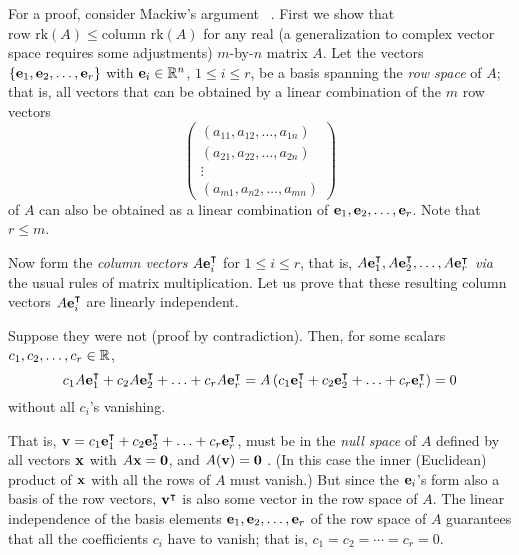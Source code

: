 {\color{OliveGreen}
\bproof

For a proof, consider Mackiw's argument ~\cite{Mackiw-1995}.
First we show that $\textrm{row rk} (A)\le \textrm{column rk} (A)$ for any real
(a generalization to complex vector space requires some adjustments)
$m$-by-$n$ matrix $A$. Let the vectors
$\{{\bf e}_1,{\bf e}_2, \ldots ,{\bf e}_r\}$ with ${\bf e}_i \in {\Bbb R}^n$, $1\le i\le r$,
be a basis spanning the
{\em row space} of
 $A$; that is, all vectors
that can be obtained by a linear combination of the $m$ row vectors
$$
\begin{pmatrix}
(a_{11},a_{12},\ldots ,a_{1n})\\
(a_{21},a_{22},\ldots ,a_{2n})\\
\vdots                    \\
(a_{m1},a_{n2},\ldots ,a_{mn})
\end{pmatrix}
$$
of $A$ can also be obtained as a linear combination of ${\bf e}_1,{\bf e}_2, \ldots ,{\bf e}_r$.
Note that $r\le m$.

Now form the {\em column vectors} $A{\bf e}_i^\intercal $ for $1\le i\le r$, that is,
$A{\bf e}_1^\intercal ,A{\bf e}_2^\intercal , \ldots ,A{\bf e}_r^\intercal $ {\em via} the usual rules of matrix multiplication.
Let us prove that these resulting column vectors $A{\bf e}_i^\intercal $ are linearly independent.

Suppose they were not (proof by contradiction).
Then, for some scalars
$c_1,c_2, \ldots ,c_r \in {\Bbb R}$,
$$
c_1 A{\bf e}_1^\intercal + c_2 A{\bf e}_2^\intercal + \ldots + c_r A{\bf e}_r^\intercal
=
 A\left(c_1{\bf e}_1^\intercal + c_2  {\bf e}_2^\intercal + \ldots + c_r  {\bf e}_r^\intercal  \right)=0
$$
without all $c_i$'s vanishing.

That is,
$
{\bf v} =
c_1{\bf e}_1^\intercal + c_2  {\bf e}_2^\intercal + \ldots + c_r  {\bf e}_r^\intercal
$, must be in the {\em null space}
of $A$ defined by all vectors ${\bf x}$ with $A{\bf x}={\bf 0}$,
and $A({\bf v})={\bf 0}$ .
(In this case the inner (Euclidean) product of ${\bf x}$ with all the rows of $A$ must vanish.)
But since the ${\bf e}_i$'s form also a basis of the row vectors,
$
{\bf v}^\intercal
$
is also some vector in the row space of $A$.
The linear independence of the basis elements
${\bf e}_1,{\bf e}_2, \ldots ,{\bf e}_r$   of the row  space of $A$
guarantees that
all the coefficients $c_i$ have to vanish; that is,
$c_1=c_2= \cdots =c_r =0$.

}
